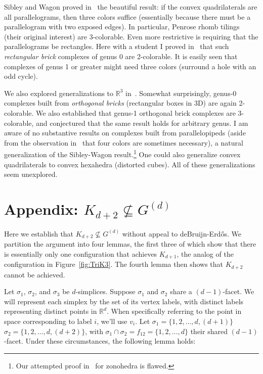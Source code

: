 \pdfoutput=1  \documentclass[]{article}
\newcommand{\seclab}[1]{\label{sec:#1}}
\newcommand{\figref}[1]{\ref{fig:#1}}
\def\R{{\mathbb{R}}}
\def\s{{\sigma}}
\begin{document}
Sibley and Wagon proved in~\cite{sw-rpt3c-00}
the beautiful result: if the convex quadrilaterals are all parallelograms,
then three colors suffice
(essentially because there must be a parallelogram with two exposed edges).
In particular, Penrose rhomb tilings (their original interest) are 3-colorable.
Even more restrictive is requiring that the parallelograms be
rectangles.  Here with a student I proved  in~\cite{go-cobb-03} that such
\emph{rectangular brick} complexes of genus 0 are 2-colorable.
It is easily seen that complexes of genus 1 or greater might need
three colors (surround a hole with an odd cycle).


We also explored generalizations to $\R^3$ in~\cite{go-cobb-03}.
Somewhat surprisingly, genus-0 complexes built from \emph{orthogonal
bricks} (rectangular boxes in 3D) are again 2-colorable.
We also established that genus-1 orthogonal brick complexes are
3-colorable,
and conjectured that the same result holds for arbitrary genus.
I am aware of no substantive results on complexes built from
parallelopipeds (aside from the observation in~\cite{go-cobb-03} that
four colors are sometimes necessary), 
a natural generalization of the Sibley-Wagon result.\footnote{
  Our attempted proof in~\cite{go-cobb-03} for zonohedra is flawed.
}
One could also generalize convex quadrilaterals to convex hexahedra
(distorted cubes).
All of these generalizations seem unexplored.


\section{Appendix: $K_{d+2} \not\subseteq G^{(d)}$}
\seclab{Kd2}
Here we establish that $K_{d+2} \not\subseteq G^{(d)}$ without appeal
to deBruijn-Erd\H{o}s.
We partition the argument into four lemmas, the first three of which
show that there is essentially only one configuration that
achieves $K_{d+1}$, the analog of the configuration in
Figure~\figref{TriK3}.
The fourth lemma then shows that $K_{d+2}$ cannot be achieved.

Let $\s_1$, $\s_2$, and $\s_3$ be $d$-simplices.
Suppose $\s_1$ and $\s_2$ share a $(d{-}1)$-facet.
We will represent each simplex by the set of its vertex labels,
with distinct labels representing distinct points in $\R^d$.
When specifically referring to the point in space corresponding
to label $i$, we'll use $v_i$.
Let $\s_1= \{ 1,2,\ldots,d,(d{+}1) \}$
$\s_2= \{ 1,2,\ldots,d,(d{+}2) \}$,
with $\s_1 \cap \s_2 = f_{12}=\{ 1,2,\ldots,d \}$ their shared $(d{-}1)$-facet.
Under these circumstances, the following lemma holds:
\end{document}
